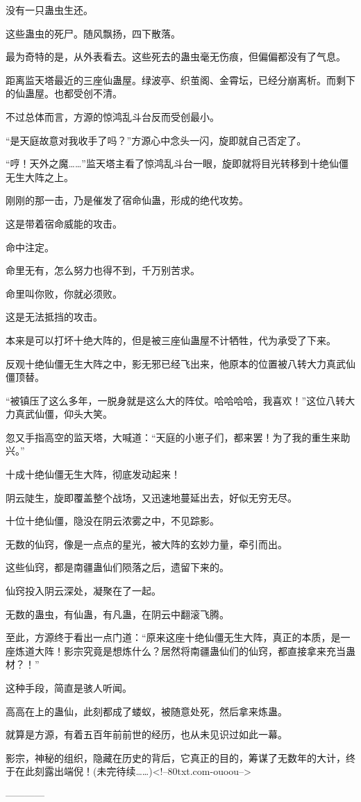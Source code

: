 \begin{this_body}
没有一只蛊虫生还。

这些蛊虫的死尸。随风飘扬，四下散落。

最为奇特的是，从外表看去。这些死去的蛊虫毫无伤痕，但偏偏都没有了气息。

距离监天塔最近的三座仙蛊屋。绿波亭、织茧阁、金霄坛，已经分崩离析。而剩下的仙蛊屋。也都受创不清。

不过总体而言，方源的惊鸿乱斗台反而受创最小。

“是天庭故意对我收手了吗？”方源心中念头一闪，旋即就自己否定了。

“哼！天外之魔……”监天塔主看了惊鸿乱斗台一眼，旋即就将目光转移到十绝仙僵无生大阵之上。

刚刚的那一击，乃是催发了宿命仙蛊，形成的绝代攻势。

这是带着宿命威能的攻击。

命中注定。

命里无有，怎么努力也得不到，千万别苦求。

命里叫你败，你就必须败。

这是无法抵挡的攻击。

本来是可以打坏十绝大阵的，但是被三座仙蛊屋不计牺牲，代为承受了下来。

反观十绝仙僵无生大阵之中，影无邪已经飞出来，他原本的位置被八转大力真武仙僵顶替。

“被镇压了这么多年，一脱身就是这么大的阵仗。哈哈哈哈，我喜欢！”这位八转大力真武仙僵，仰头大笑。

忽又手指高空的监天塔，大喊道：“天庭的小崽子们，都来罢！为了我的重生来助兴。”

十成十绝仙僵无生大阵，彻底发动起来！

阴云陡生，旋即覆盖整个战场，又迅速地蔓延出去，好似无穷无尽。

十位十绝仙僵，隐没在阴云浓雾之中，不见踪影。

无数的仙窍，像是一点点的星光，被大阵的玄妙力量，牵引而出。

这些仙窍，都是南疆蛊仙们陨落之后，遗留下来的。

仙窍投入阴云深处，凝聚在了一起。

无数的蛊虫，有仙蛊，有凡蛊，在阴云中翻滚飞腾。

至此，方源终于看出一点门道：“原来这座十绝仙僵无生大阵，真正的本质，是一座炼道大阵！影宗究竟是想炼什么？居然将南疆蛊仙们的仙窍，都直接拿来充当蛊材？！”

这种手段，简直是骇人听闻。

高高在上的蛊仙，此刻都成了蝼蚁，被随意处死，然后拿来炼蛊。

就算是方源，有着五百年前前世的经历，也从未见识过如此一幕。

影宗，神秘的组织，隐藏在历史的背后，它真正的目的，筹谋了无数年的大计，终于在此刻露出端倪！(未完待续……)<!--80txt.com-ouoou-->

------------

\end{this_body}

